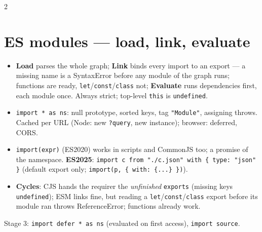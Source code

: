 \documentclass[8pt]{extarticle}
\newcommand\spr{\hbox{.}\hbox{.}\hbox{.}}
\newcommand\ct[1]{\texttt{#1}}
\begin{document}
\begin{multicols}{2}
\section{ES modules — load, link, evaluate}
\begin{itemize}
  \item \textbf{Load} parses the whole graph; \textbf{Link} binds every import to an export —
        a missing name is a SyntaxError before any module of the graph runs; functions are
        ready, \ct{let}/\ct{const}/\ct{class} not; \textbf{Evaluate} runs dependencies
        first, each module once. Always strict; top-level \ct{this} is \ct{undefined}.
  \item \ct{import * as ns}: null prototype, sorted keys, tag \ct{"Module"}, assigning
        throws. Cached per URL (Node: new \ct{?query}, new instance); browser: deferred, CORS.
  \item \ct{import(expr)} (ES2020) works in scripts and CommonJS too; a promise of the
        namespace. \textbf{ES2025}: \ct{import c from "./c.json" with \{ type: "json" \}}
        (default export only; \ct{import(p, \{ with: \{\spr\} \})}).
  \item \textbf{Cycles}: CJS hands the requirer the \emph{unfinished} \ct{exports} (missing
        keys \ct{undefined}); ESM links fine, but reading a \ct{let}/\ct{const}/\ct{class}
        export before its module ran throws ReferenceError; functions already work.
\end{itemize}
\noindent{}\par
Stage 3: \ct{import defer * as ns} (evaluated on first access), \ct{import source}.


\end{multicols}
\end{document}
